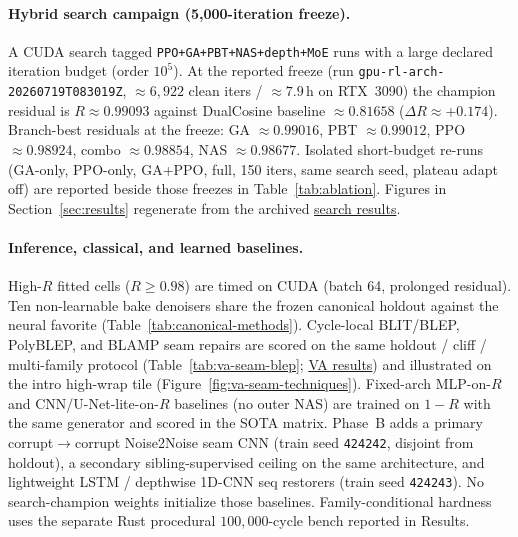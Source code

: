 \paragraph{Hybrid search campaign (5,000-iteration freeze).}
A CUDA search tagged \texttt{PPO+GA+PBT+NAS+depth+MoE} runs with a large declared iteration budget (order $10^{5}$).
At the reported freeze (run \texttt{gpu-rl-arch-20260719T083019Z}, $\approx 6{,}922$ clean iters / $\approx 7.9$\,h on RTX~3090) the champion residual is $R\approx 0.99093$ against DualCosine baseline $\approx 0.81658$ ($\Delta R\approx{+}0.174$).
Branch-best residuals at the freeze: GA $\approx 0.99016$, PBT $\approx 0.99012$, PPO $\approx 0.98924$, combo $\approx 0.98854$, NAS $\approx 0.98677$.
Isolated short-budget re-runs (GA-only, PPO-only, GA{+}PPO, full, 150 iters, same search seed, plateau adapt off) are reported beside those freezes in Table~\ref{tab:ablation}.
Figures in Section~\ref{sec:results} regenerate from the archived \href{https://github.com/reeldemo/denoise-opt-meta/blob/master/paper/Unsupervised_Wavetable_Seam_Artifact_Repair_via_Hybrid_GA-PPO_Meta-Search_v10/figures/meta_approach_compare_v10.json}{search results}.

\paragraph{Inference, classical, and learned baselines.}
High-$R$ fitted cells ($R\ge 0.98$) are timed on CUDA (batch 64, prolonged residual).
Ten non-learnable bake denoisers share the frozen canonical holdout against the neural favorite (Table~\ref{tab:canonical-methods}).
Cycle-local BLIT/BLEP, PolyBLEP, and BLAMP seam repairs are scored on the same holdout / cliff / multi-family protocol (Table~\ref{tab:va-seam-blep}; \href{https://github.com/reeldemo/denoise-opt-meta/blob/master/paper/Unsupervised_Wavetable_Seam_Artifact_Repair_via_Hybrid_GA-PPO_Meta-Search_v10/figures/va_seam_blep.json}{VA results}) and illustrated on the intro high-wrap tile (Figure~\ref{fig:va-seam-techniques}).
Fixed-arch MLP-on-$R$ and CNN/U-Net-lite-on-$R$ baselines (no outer NAS) are trained on $1{-}R$ with the same generator and scored in the SOTA matrix.
Phase~B adds a primary corrupt$\to$corrupt Noise2Noise seam CNN (train seed \texttt{424242}, disjoint from holdout), a secondary sibling-supervised ceiling on the same architecture, and lightweight LSTM / depthwise 1D-CNN seq restorers (train seed \texttt{424243}).
No search-champion weights initialize those baselines.
Family-conditional hardness uses the separate Rust procedural $100{,}000$-cycle bench reported in Results.

